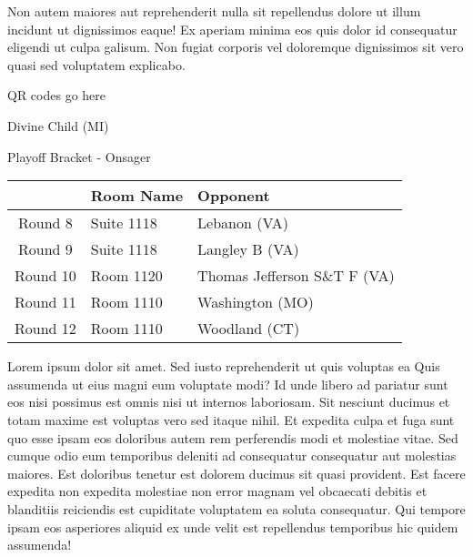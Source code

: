 \documentclass{article}%
\begin{document}
\newline%
Non autem maiores aut reprehenderit nulla sit repellendus dolore ut illum incidunt ut dignissimos eaque! Ex aperiam minima eos quis dolor id consequatur eligendi ut culpa galisum. Non fugiat corporis vel doloremque dignissimos sit vero quasi sed voluptatem explicabo.\newline%
\newline%
%
\vspace*{30pt}%
\begin{center}%
\begin{Huge}%
QR codes go here%
\end{Huge}%
\end{center}%
\newpage%
\begin{center}%
\begin{Huge}%
Divine Child (MI)%
\end{Huge}%
\vspace*{8pt}%
\linebreak%
\begin{Large}%
Playoff Bracket {-} Onsager%
\end{Large}%
\end{center}%
\begin{tabularx}{\textwidth}{|c|Y|Y|}%
\hline%
&Room Name&Opponent\\%
\hline%
Round 8&Suite 1118&Lebanon (VA)\\%
Round 9&Suite 1118&Langley B (VA)\\%
Round 10&Room 1120&Thomas Jefferson S\&T F (VA)\\%
Round 11&Room 1110&Washington (MO)\\%
Round 12&Room 1110&Woodland (CT)\\%
\hline%
\end{tabularx}%
\vspace*{8pt}%
\linebreak%
\newline%
\newline%
Lorem ipsum dolor sit amet. Sed iusto reprehenderit ut quis voluptas ea Quis assumenda ut eius magni eum voluptate modi? Id unde libero ad pariatur sunt eos nisi possimus est omnis nisi ut internos laboriosam. Sit nesciunt ducimus et totam maxime est voluptas vero sed itaque nihil. Et expedita culpa et fuga sunt quo esse ipsam eos doloribus autem rem perferendis modi et molestiae vitae.\newline%
\newline%
Sed cumque odio eum temporibus deleniti ad consequatur consequatur aut molestias maiores. Est doloribus tenetur est dolorem ducimus sit quasi provident. Est facere expedita non expedita molestiae non error magnam vel obcaecati debitis et blanditiis reiciendis est cupiditate voluptatem ea soluta consequatur. Qui tempore ipsam eos asperiores aliquid ex unde velit est repellendus temporibus hic quidem assumenda!\newline%
\end{document}
